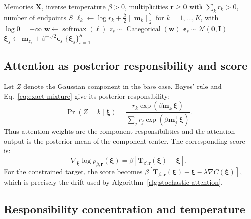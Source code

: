 \begin{algorithm}[H]
\caption{Exact sampler for the unmodified tied Hopfield target}
\label{alg:exact-sampler}
\begin{algorithmic}[1]
\REQUIRE Memories $\mathbf X$, inverse temperature $\beta>0$, multiplicities
$\mathbf r\geq\mathbf0$ with $\sum_k r_k>0$, number of endpoints $S$
\STATE $\ell_k\leftarrow
\log r_k+\frac\beta2\lVert\mathbf m_k\rVert_2^2$ for $k=1,\ldots,K$,
with $\log 0=-\infty$
\STATE $\mathbf w\leftarrow\operatorname{softmax}(\boldsymbol\ell)$
\STATE $z_s\sim\operatorname{Categorical}(\mathbf w)$
\STATE $\boldsymbol\epsilon_s\sim\mathcal N(\mathbf0,\mathbf I)$
\STATE $\boldsymbol\xi_s\leftarrow
\mathbf m_{z_s}+\beta^{-1/2}\boldsymbol\epsilon_s$
\ENDFOR
\RETURN $\{\boldsymbol\xi_s\}_{s=1}^{S}$
\end{algorithmic}
\end{algorithm}

\subsection{Attention as posterior responsibility and score}

Let $Z$ denote the Gaussian component in the base case. Bayes' rule and
Eq.~\eqref{eq:exact-mixture} give its posterior responsibility:
\begin{equation}
\Pr(Z=k\mid\boldsymbol\xi)
=\frac{r_k\exp(\beta\mathbf m_k^\top\boldsymbol\xi)}
{\sum_j r_j\exp(\beta\mathbf m_j^\top\boldsymbol\xi)}.
\label{eq:responsibilities}
\end{equation}
Thus attention weights are the component responsibilities and the attention
output is the posterior mean of the component center. The corresponding score
is:
\begin{equation}
\nabla_{\boldsymbol\xi}\log p_{\beta,\mathbf r}(\boldsymbol\xi)
=\beta\left[\mathbf T_{\beta,\mathbf r}(\boldsymbol\xi)
-\boldsymbol\xi\right].
\label{eq:exact-score}
\end{equation}
For the constrained target, the score becomes
$\beta[\mathbf T_{\beta,\mathbf r}(\boldsymbol\xi)-\boldsymbol\xi
-\lambda\nabla C(\boldsymbol\xi)]$, which is precisely the drift used by
Algorithm~\ref{alg:stochastic-attention}.

\subsection{Responsibility concentration and temperature}


